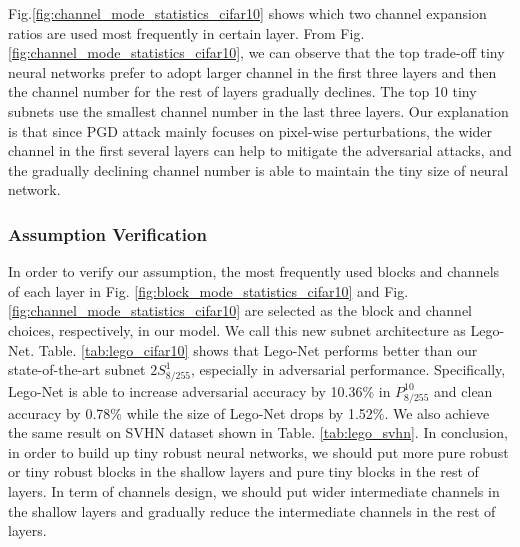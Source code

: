 \documentclass[journal]{IEEEtran}
\begin{document}
Fig.\ref{fig:channel_mode_statistics_cifar10} shows which two channel expansion ratios are used most frequently in certain layer. From Fig. \ref{fig:channel_mode_statistics_cifar10}, we can observe that the top trade-off tiny neural networks prefer to adopt larger channel in the first three layers and then the channel number for the rest of layers gradually declines. The top 10 tiny subnets use the smallest channel number in the last three layers. Our explanation is that since PGD attack mainly focuses on pixel-wise perturbations, the wider channel in the first several layers can help to mitigate the adversarial attacks, and the gradually declining channel number is able to maintain the tiny size of neural network.
\subsubsection{\textbf{Assumption Verification}}
In order to verify our assumption, the most frequently used blocks and channels of each layer in Fig. \ref{fig:block_mode_statistics_cifar10} and Fig. \ref{fig:channel_mode_statistics_cifar10} are selected as the block and channel choices, respectively, in our model. We call this new subnet architecture as Lego-Net. Table. \ref{tab:lego_cifar10} shows that Lego-Net performs better than our state-of-the-art subnet $2S^{1}_{8/255}$, especially in adversarial performance. Specifically, Lego-Net is able to increase adversarial accuracy by 10.36\% in $P_{8/255}^{10}$ and clean accuracy by 0.78\% while the size of Lego-Net drops by 1.52\%. We also achieve the same result on SVHN dataset shown in Table. \ref{tab:lego_svhn}. In conclusion, in order to build up tiny robust neural networks, we should put more pure robust or tiny robust blocks in the shallow layers and pure tiny blocks in the rest of layers. In term of channels design, we should put wider intermediate channels in the shallow layers and gradually reduce the intermediate channels in the rest of layers.
\end{document}
